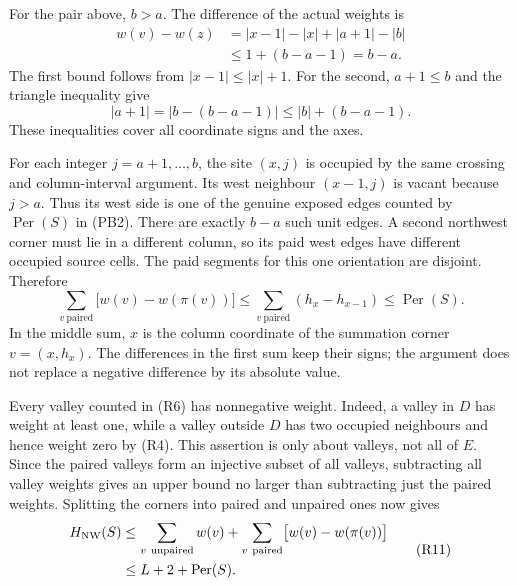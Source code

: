 \documentclass[
  11pt,
  a4paper,
]{article}
\begin{document}
For the pair above, \(b>a\). The difference of the actual weights is \[
\begin{aligned}
w(v)-w(z)
 &=|x-1|-|x|+|a+1|-|b|\\
 &\leq 1+(b-a-1)=b-a.
\end{aligned}
\tag{R9}
\] The first bound follows from \(|x-1|\leq|x|+1\). For the second,
\(a+1\leq b\) and the triangle inequality give \[
|a+1|=|b-(b-a-1)|\leq|b|+(b-a-1).
\] These inequalities cover all coordinate signs and the axes.

For each integer \(j=a+1,\ldots,b\), the site \((x,j)\) is occupied by
the same crossing and column-interval argument. Its west neighbour
\((x-1,j)\) is vacant because \(j>a\). Thus its west side is one of the
genuine exposed edges counted by \(\operatorname{Per}(S)\) in (PB2).
There are exactly \(b-a\) such unit edges. A second northwest corner
must lie in a different column, so its paid west edges have different
occupied source cells. The paid segments for this one orientation are
disjoint. Therefore \[
\sum_{v\ \mathrm{paired}}\bigl[w(v)-w(\pi(v))\bigr]
\leq\sum_{v\ \mathrm{paired}}(h_x-h_{x-1})
\leq\operatorname{Per}(S).
\tag{R10}
\] In the middle sum, \(x\) is the column coordinate of the summation
corner \(v=(x,h_x)\). The differences in the first sum keep their signs;
the argument does not replace a negative difference by its absolute
value.

Every valley counted in (R6) has nonnegative weight. Indeed, a valley in
\(D\) has weight at least one, while a valley outside \(D\) has two
occupied neighbours and hence weight zero by (R4). This assertion is
only about valleys, not all of \(E\). Since the paired valleys form an
injective subset of all valleys, subtracting all valley weights gives an
upper bound no larger than subtracting just the paired weights.
Splitting the corners into paired and unpaired ones now gives \[
\begin{aligned}
H_{\rm NW}(S)
&\leq \sum_{v\ \mathrm{unpaired}}w(v)
    +\sum_{v\ \mathrm{paired}}\bigl[w(v)-w(\pi(v))\bigr]\\
&\leq L+2+\operatorname{Per}(S).
\end{aligned}
\tag{R11}
\]
\end{document}
